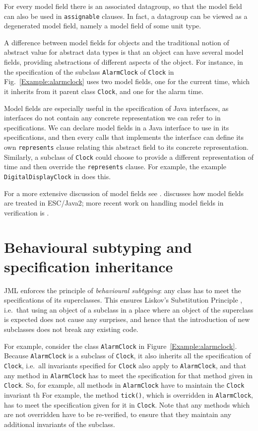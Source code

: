 \documentclass{llncs}
\begin{document}
For every model field there is an associated datagroup, so that the 
model field can also be used in \texttt{assignable} clauses.
In fact, a datagroup can be viewed as a degenerated model field, namely
a model field of some unit type.

A difference between model fields for objects and the traditional notion of
abstract value for abstract data types is that an object can have several
model fields, providing abstractions of different aspects of the object.
For instance, in the specification of the subclass \texttt{AlarmClock}
of \texttt{Clock} in Fig.~\ref{Example:alarmclock} uses 
two model fields, one for the current time, which it inherits from
it parent class \texttt{Clock}, and one for the alarm time.

Model fields are especially useful in the specification of Java interfaces,
as interfaces do not contain any concrete representation we can refer
to in specifications. We can declare model fields in a Java interface
to use in its specifications, and then every calls that implements 
the interface can define its own \texttt{represents} clause relating
this abstract field to its concrete representation. Similarly, a subclass
of \texttt{Clock} could choose to provide a different representation
of time and then override the \texttt{represents} clause. For example,
the example \texttt{DigitalDisplayClock} in 
does this.

For a more extensive discussion of model fields see \cite{Cheon-etal05}.
\cite{Cok05} discusses how model fields are treated in ESC/Java2;
more recent work on handling model fields in verification is \cite{LeinoMuller06}.

\section{Behavioural subtyping and specification inheritance}
\label{Sec:behsubtyping}

JML enforces the principle of \emph{behavioural subtyping}: any class
has to meet the specifications of its superclasses.
This ensures Liskov's Substitution Principle \cite{LiskovWing94},
i.e.\ that using an object of a subclass in a place where an object of 
the superclass is expected does not cause any surprises, and hence that 
the introduction of new subclasses does not break any existing code.

For example, consider the class \texttt{AlarmClock} in Figure~\ref{Example:alarmclock}.
Because \texttt{AlarmClock} is a subclass of \texttt{Clock}, it also
inherits all the specification of \texttt{Clock}, i.e.\ 
all invariants specified for \texttt{Clock} also apply to \texttt{AlarmClock},
and that any method in \texttt{AlarmClock} has to meet the specification
for that method given in  \texttt{Clock}.
So, for example, all methods in \texttt{AlarmClock} have to maintain the
\texttt{Clock} invariant th
For example, the method \texttt{tick()}, which is overridden in \texttt{AlarmClock},
has to meet the specification given for it in \texttt{Clock}. 
Note that any methods which are not overridden have to be re-verified, to ensure 
that they maintain any additional invariants of the subclass.
\end{document}
